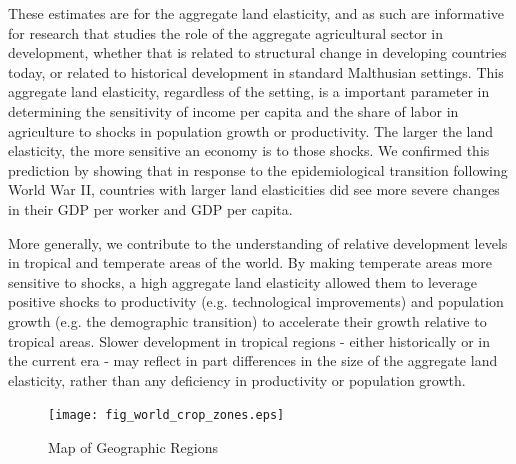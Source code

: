 \documentclass[11pt]{article}
\begin{document}
These estimates are for the aggregate land elasticity, and as such are informative for research that studies the role of the aggregate agricultural sector in development, whether that is related to structural change in developing countries today, or related to historical development in standard Malthusian settings. This aggregate land elasticity, regardless of the setting, is a important parameter in determining the sensitivity of income per capita and the share of labor in agriculture to shocks in population growth or productivity. The larger the land elasticity, the more sensitive an economy is to those shocks. We confirmed this prediction by showing that in response to the epidemiological transition following World War II, countries with larger land elasticities did see more severe changes in their GDP per worker and GDP per capita.

More generally, we contribute to the understanding of relative development levels in tropical and temperate areas of the world. By making temperate areas more sensitive to shocks, a high aggregate land elasticity allowed them to leverage positive shocks to productivity (e.g. technological improvements) and population growth (e.g. the demographic transition) to accelerate their growth relative to tropical areas. Slower development in tropical regions - either historically or in the current era - may reflect in part differences in the size of the aggregate land elasticity, rather than any deficiency in productivity or population growth. 

\newpage

\clearpage

\onehalfspacing
{\small


}

\clearpage

\begin{figure}[!htb]
\begin{center}
\caption{Map of Geographic Regions}
\label{FIG_crop_zones}
\texttt{[image: fig\_world\_crop\_zones.eps]}
\end{center}
\vspace{-.5cm}
\end{figure}
\end{document}
